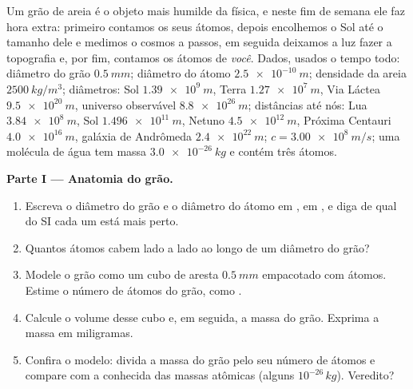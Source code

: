 \begin{problem}
\label{pb:g10:orders-of-magnitude:1}
Um grão de areia é o objeto mais humilde da física, e neste fim de
semana ele faz hora extra: primeiro contamos os seus átomos, depois
encolhemos o Sol até o tamanho dele e medimos o cosmos a passos, em
seguida deixamos a luz fazer a topografia e, por fim, contamos os átomos
de \emph{você}. Dados, usados o tempo todo: diâmetro do grão
$\qty{0.5}{mm}$; diâmetro do átomo $\qty{2.5e-10}{m}$; densidade da
areia $\qty{2500}{kg/m^3}$; diâmetros: Sol $\qty{1.39e9}{m}$, Terra
$\qty{1.27e7}{m}$, Via Láctea $\qty{9.5e20}{m}$, universo observável
$\qty{8.8e26}{m}$; distâncias até nós: Lua $\qty{3.84e8}{m}$, Sol
$\qty{1.496e11}{m}$, Netuno $\qty{4.5e12}{m}$, Próxima Centauri
$\qty{4.0e16}{m}$, galáxia de Andrômeda $\qty{2.4e22}{m}$;
$c = \qty{3.00e8}{m/s}$; uma molécula de água tem massa
$\qty{3.0e-26}{kg}$ e contém três átomos.

\medskip
\noindent\textbf{Parte I --- Anatomia do grão.}
\begin{enumerate}
  \item Escreva o diâmetro do grão e o diâmetro do átomo em , em
        , e diga de qual  do SI cada um está
        mais perto.
  \item Quantos átomos cabem lado a lado ao longo de um diâmetro do
        grão?
  \item Modele o grão como um cubo de aresta $\qty{0.5}{mm}$ empacotado
        com átomos. Estime o número de átomos do grão, como .
  \item Calcule o volume desse cubo e, em seguida, a massa do grão.
        Exprima a massa em miligramas.
  \item Confira o modelo: divida a massa do grão pelo seu número de
        átomos e compare com a  conhecida das massas
        atômicas (alguns $10^{-26}\,\unit{kg}$). Veredito?
\end{enumerate}


\end{problem}
